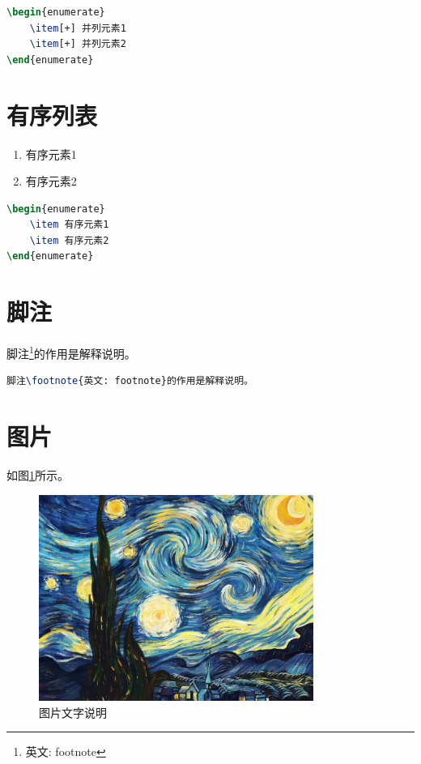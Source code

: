 \begin{lstlisting}[language=tex]
\begin{enumerate}
	\item[+] 并列元素1
	\item[+] 并列元素2
\end{enumerate}
\end{lstlisting}

\section{有序列表}

\begin{enumerate}
	\item 有序元素1
	\item 有序元素2
\end{enumerate}

\begin{lstlisting}[language=tex]
\begin{enumerate}
	\item 有序元素1
	\item 有序元素2
\end{enumerate}
\end{lstlisting}

\section{脚注}

脚注\footnote{英文: footnote}的作用是解释说明。

\begin{lstlisting}[language=tex]
脚注\footnote{英文: footnote}的作用是解释说明。
\end{lstlisting}

\section{图片}

如图\ref{fig:test}所示。

\begin{figure}[H]
	\centering
	\includegraphics[width=0.8\textwidth]{figures/test}
	\caption{图片文字说明}
	\label{fig:test}
\end{figure}

